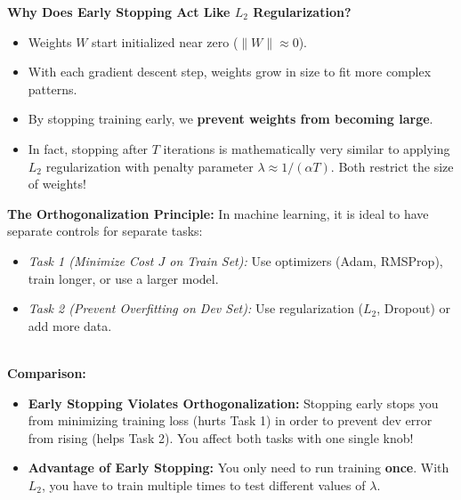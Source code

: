 \documentclass[10pt,a4paper]{article}
\begin{document}
\vspace{-2pt}

\begin{tcolorbox}[
    colframe=themeblue, colback=lightbg, arc=1.3mm, boxrule=0.5pt,
    left=5pt, right=5pt, top=2pt, bottom=2pt
]
\footnotesize
\textbf{Why Does Early Stopping Act Like $L_2$ Regularization?}
\begin{itemize}[leftmargin=8pt, itemsep=0.5pt, topsep=0pt]
    \item Weights $W$ start initialized near zero ($\|W\| \approx 0$).
    \item With each gradient descent step, weights grow in size to fit more complex patterns.
    \item By stopping training early, we \textbf{prevent weights from becoming large}.
    \item In fact, stopping after $T$ iterations is mathematically very similar to applying $L_2$ regularization with penalty parameter $\lambda \approx 1 / (\alpha T)$. Both restrict the size of weights!
\end{itemize}
\end{tcolorbox}

\vspace{-2pt}

\begin{tcolorbox}[
    colframe=accentred, colback=white, coltitle=white,
    fonttitle=\bfseries\sffamily\small,
    title={The Orthogonalization Trade-off: Early Stopping vs. $L_2$ Regularization},
    arc=1.3mm, boxrule=0.5pt, left=5pt, right=5pt, top=2pt, bottom=2pt
]
\footnotesize
\textbf{The Orthogonalization Principle:} In machine learning, it is ideal to have separate controls for separate tasks:
\begin{itemize}[leftmargin=8pt, itemsep=0.5pt, topsep=0pt]
    \item \textit{Task 1 (Minimize Cost $J$ on Train Set):} Use optimizers (Adam, RMSProp), train longer, or use a larger model.
    \item \textit{Task 2 (Prevent Overfitting on Dev Set):} Use regularization ($L_2$, Dropout) or add more data.
\end{itemize}
\hrulefill\\[1pt]
\textbf{Comparison:}
\begin{itemize}[leftmargin=8pt, itemsep=0.5pt, topsep=0pt]
    \item \textbf{Early Stopping Violates Orthogonalization:} Stopping early stops you from minimizing training loss (hurts Task 1) in order to prevent dev error from rising (helps Task 2). You affect both tasks with one single knob!
    \item \textbf{Advantage of Early Stopping:} You only need to run training \textbf{once}. With $L_2$, you have to train multiple times to test different values of $\lambda$.
\end{itemize}
\end{tcolorbox}
\end{document}
